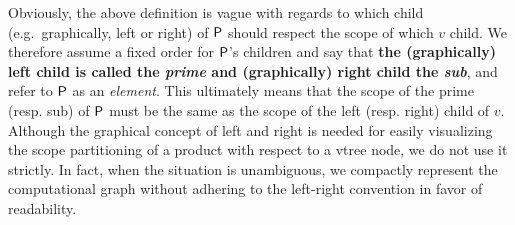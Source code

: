 Obviously, the above definition is vague with regards to which child (e.g.\ graphically, left or
right) of $\operatorname{\textup{\textsf{P}}}$ should respect the scope of which $v$ child. We therefore assume a fixed order
for $\operatorname{\textup{\textsf{P}}}$'s children and say that \textbf{the (graphically) left child is called the \emph{prime}
and (graphically) right child the \emph{sub}}, and refer to $\operatorname{\textup{\textsf{P}}}$ as an \emph{element}. This
ultimately means that the scope of the prime (resp. sub) of $\operatorname{\textup{\textsf{P}}}$ must be the same as the scope
of the left (resp. right) child of $v$. Although the graphical concept of left and right is needed
for easily visualizing the scope partitioning of a product with respect to a vtree node, we do not
use it strictly. In fact, when the situation is unambiguous, we compactly represent the
computational graph without adhering to the left-right convention in favor of readability.

